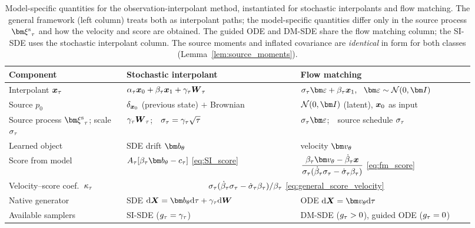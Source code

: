 \begin{table}[ht]
    \centering
    \caption{Model-specific quantities for the observation-interpolant method, instantiated for stochastic interpolants and flow matching. The general framework (left column) treats both as interpolant paths; the model-specific quantities differ only in the source process $\src_\tau$ and how the velocity and score are obtained. The guided ODE and DM-SDE share the flow matching column; the SI-SDE uses the stochastic interpolant column. The source moments and inflated covariance are \emph{identical} in form for both classes (Lemma~\ref{lem:source_moments}).}
    \label{tab:si_vs_fm}
    \small
    \begin{tabular}{p{0.235\linewidth}|p{0.345\linewidth}|p{0.345\linewidth}}
        \toprule
        \textbf{Component} & \textbf{Stochastic interpolant} & \textbf{Flow matching} \\
        \midrule
        Interpolant $\boldsymbol{x}_\tau$
            & $\alpha_\tau\boldsymbol{x}_0 + \beta_\tau\boldsymbol{x}_1 + \gamma_\tau\boldsymbol{W}_\tau$
            & $\sigpath_\tau\latentnoise + \beta_\tau\bx_1,\ \ \latentnoise\sim\mathcal{N}(0,\bI)$ \\
        Source $p_0$
            & $\delta_{\boldsymbol{x}_0}$ (previous state) $+$ Brownian
            & $\mathcal{N}(0,\bI)$ (latent), $\boldsymbol{x}_0$ as input \\
        Source process $\src_\tau$; scale $\sigma_\tau$
            & $\gamma_\tau\boldsymbol{W}_\tau$;\ \ $\sigma_\tau=\gamma_\tau\sqrt\tau$
            & $\sigpath_\tau\latentnoise$;\ \ source schedule $\sigma_\tau$ \\
        Learned object
            & SDE drift $\drift_\theta$
            & velocity $\fmvel_\theta$ \\
        Score from model
            & $A_\tau[\beta_\tau\drift_\theta - c_\tau]$ \eqref{eq:SI_score}
            & $\dfrac{\beta_\tau\fmvel_\theta-\dot\beta_\tau\bx}{\sigpath_\tau(\dot\beta_\tau\sigpath_\tau-\dot\sigpath_\tau\beta_\tau)}$ \eqref{eq:fm_score} \\
        Velocity--score coef.\ $\kappa_\tau$
            & \multicolumn{2}{c}{$\sigma_\tau(\dot\beta_\tau\sigma_\tau-\dot{\sigma}_\tau\beta_\tau)/\beta_\tau$ \eqref{eq:general_score_velocity}} \\
        Native generator
            & SDE $\rd\bX=\drift_\theta\rd\tau+\gamma_\tau\rd\bW$
            & ODE $\rd\bX=\fmvel_\theta\rd\tau$ \\
        Available samplers
            & SI-SDE ($g_\tau=\gamma_\tau$)
            & DM-SDE ($g_\tau>0$), guided ODE ($g_\tau=0$) \\

\end{tabular}
\end{table}
